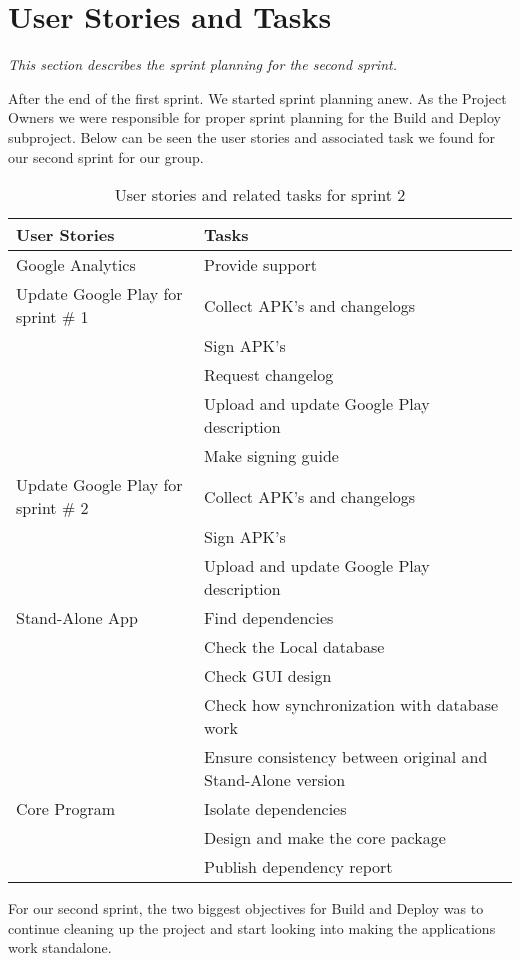 \section{User Stories and Tasks} \label{Sprint2_SecUserStoriesAndTasks}
\textit{This section describes the sprint planning for the second sprint.}

After the end of the first sprint. We started sprint planning anew. As the Project Owners we were responsible for proper sprint planning for the Build and Deploy subproject. Below can be seen the user stories and associated task we found for our second sprint for our group.

\begin{table}[H]
	\centering
	\begin{tabular}{ll}
		\textbf{User Stories} & \textbf{Tasks}\\ \hline \noalign{\vskip 2mm}
		Google Analytics & Provide support\\ \hline
		Update Google Play for sprint \# 1 & Collect APK's and changelogs\\
		& Sign APK's\\
		& Request changelog\\
		& Upload and update Google Play description\\
		& Make signing guide\\ \hline
		Update Google Play for sprint \# 2 & Collect APK's and changelogs\\
		& Sign APK's\\ 
		& Upload and update Google Play description\\ \hline
		Stand-Alone App & Find dependencies\\
		& Check the Local database\\
		& Check GUI design\\
		& Check how synchronization with database work\\
		& Ensure consistency between original and Stand-Alone version\\ \hline
		Core Program & Isolate dependencies\\
		& Design and make the core package\\
		& Publish dependency report\\
	\end{tabular}
	\caption{User stories and related tasks for sprint 2}
	\label{Sprint2_UserStories2_table}
\end{table}

For our second sprint, the two biggest objectives for Build and Deploy was to continue cleaning up the project and start looking into making the applications work standalone.\\